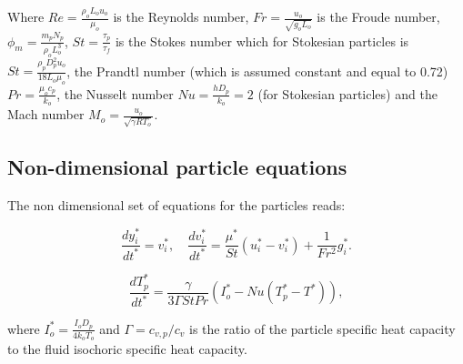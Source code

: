 \documentclass[a4paper,10pt]{report}
\begin{document}
Where $Re=\frac{\rho_o L_o u_o}{\mu_o}$ is the Reynolds number, $Fr=\frac{u_o}{\sqrt{g_o L_o}}$ is the Froude number, $\phi_m=\frac{m_p N_p}{\rho_o L_o^3}$, $St=\frac{\tau_p}{\tau_f}$ is the Stokes number which for Stokesian particles is $St=\frac{\rho_p D_p^2 u_o}{18 L_o \mu_o}$, the Prandtl number (which is assumed constant and equal to 0.72) $Pr=\frac{\mu_o c_p}{k_o}$, the Nusselt number $Nu=\frac{h D_p}{k_o}=2$ (for Stokesian particles) and  the Mach number $M_o=\frac{u_o}{\sqrt{\gamma R T_o}}$. 


\subsection*{Non-dimensional particle equations}

The non dimensional set of equations for the particles reads:

\begin{equation}
\label{eq:part_motion}
\frac{d y_i^*}{dt^*} = v_i^*, \quad \frac{d v_i^*}{dt^*} = \frac{\mu^*}{St}\left(u_i^* - v_i^*\right) + \frac{1}{Fr^2}g_i^*.
\end{equation}

\begin{equation}
\label{eq:part_energy}
\frac{d T_p^*}{dt^*} = \frac{\gamma}{3\Gamma St Pr} \left(I_o^* - Nu(T_p^*-T^*)\right),
\end{equation}

where $I_o^*=\frac{I_o D_p}{4k_oT_o}$ and $\Gamma=c_{v,p}/c_{v}$ is the ratio of the particle specific heat capacity to the fluid isochoric specific heat capacity. 







\end{document}
